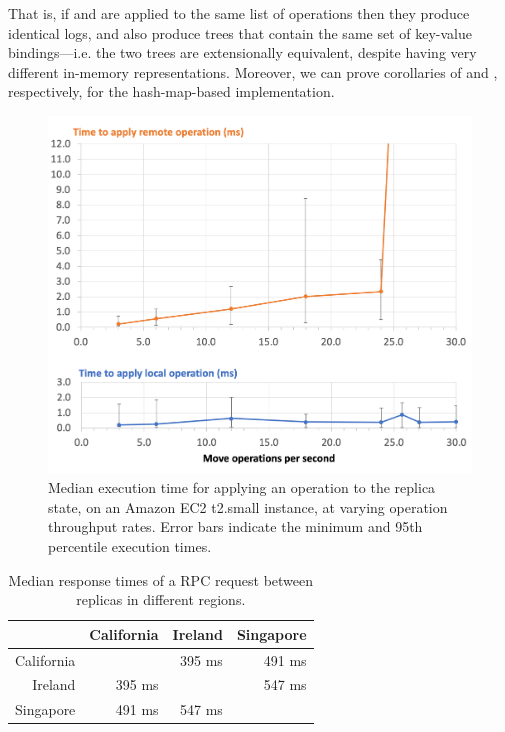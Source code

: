 \documentclass[sigplan,anonymous]{acmart}
\begin{document}
That is, if  and  are applied to the same list of operations then they produce identical logs, and also produce trees that contain the same set of key-value bindings---i.e. the two trees are extensionally equivalent, despite having very different in-memory representations.
Moreover, we can prove corollaries of  and , respectively, for the hash-map-based implementation.

\begin{figure}
  \includegraphics[width=\columnwidth,keepaspectratio=true]{plots.png}
  \caption{Median execution time for applying an operation to the replica state, on an Amazon EC2 t2.small instance, at varying operation throughput rates. Error bars indicate the minimum and 95th percentile execution times.}
  \label{fig:plots}
\end{figure}

\begin{table}
  \caption{Median response times of a RPC request between replicas in different regions.}
  \label{tab:rpc-times}
  \begin{tabular}{r|rrr}
    \toprule
               & California & Ireland & Singapore \\
    \midrule
    California &            & 395 ms  & 491 ms    \\
    Ireland    & 395 ms     &         & 547 ms    \\
    Singapore  & 491 ms     & 547 ms  &           \\
    \bottomrule
\end{tabular}
\end{table}
\end{document}
